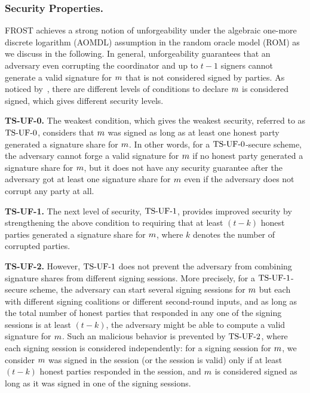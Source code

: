 \subsubsection{Security Properties.}
FROST achieves a strong notion of unforgeability under the algebraic one-more discrete logarithm (AOMDL) assumption in the random oracle model (ROM) as we discuss in the following.
In general, unforgeability guarantees that an adversary even corrupting the coordinator and up to $t-1$ signers cannot generate a valid signature for $m$ that is not considered signed by parties. As noticed by~\cite{BellareCKMTZ22}, there are different levels of conditions to declare $m$ is considered signed, which gives different security levels.


\medskip

\textbf{TS-UF-0.} The weakest condition, which gives the weakest security, referred to as $\mathrm{TS}\mbox{-}\mathrm{UF}\mbox{-}{0}$, considers that $m$ was signed as long as at least one honest party generated a signature share for $m$. In other words, for a $\mathrm{TS}\mbox{-}\mathrm{UF}\mbox{-}{0}$-secure scheme, the adversary cannot forge a valid signature for $m$ if no honest party generated a signature share for $m$, but it does not have any security guarantee after the adversary got at least one signature share for $m$ even if the adversary does not corrupt any party at all.

\medskip

\textbf{TS-UF-1.} The next level of security, $\mathrm{TS}\mbox{-}\mathrm{UF}\mbox{-}{1}$, provides improved security by strengthening the above condition to requiring that at least $(t - k)$ honest parties generated a signature share for $m$,
where $k$ denotes the number of corrupted parties.

\medskip

\textbf{TS-UF-2.} However, $\mathrm{TS}\mbox{-}\mathrm{UF}\mbox{-}{1}$ does not prevent the adversary from combining signature shares from different signing sessions.
More precisely, for a $\mathrm{TS}\mbox{-}\mathrm{UF}\mbox{-}{1}$-secure scheme, the adversary can start several signing sessions for $m$ but each with different signing coalitions or different second-round inputs,
and as long as the total number of honest parties that responded in any one of the signing sessions is at least $(t-k)$, the adversary might be able to compute a valid signature for $m$.
Such an malicious behavior is prevented by $\mathrm{TS}\mbox{-}\mathrm{UF}\mbox{-}{2}$, where each signing session is considered independently:
for a signing session for $m$, we consider $m$ was signed in the session (or the session is valid) only if at least $(t - k)$ honest parties responded in the session, and $m$ is considered signed as long as it was signed in one of the signing sessions.

